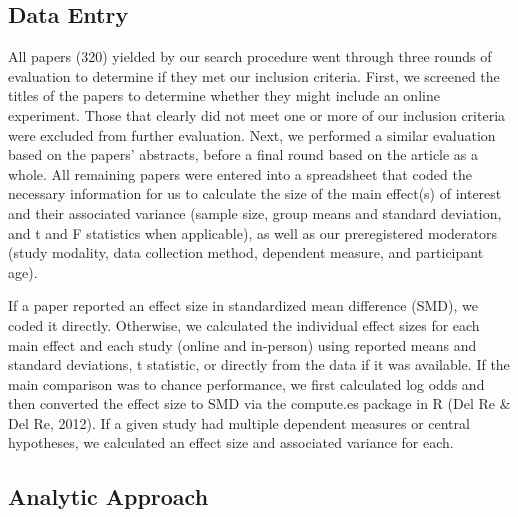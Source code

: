 \documentclass[
  man,floatsintext]{apa6}
\begin{document}
\hypertarget{data-entry}{%
\subsection{Data Entry}\label{data-entry}}

All papers (320) yielded by our search procedure went through three rounds of evaluation to determine if they met our inclusion criteria. First, we screened the titles of the papers to determine whether they might include an online experiment. Those that clearly did not meet one or more of our inclusion criteria were excluded from further evaluation. Next, we performed a similar evaluation based on the papers' abstracts, before a final round based on the article as a whole. All remaining papers were entered into a spreadsheet that coded the necessary information for us to calculate the size of the main effect(s) of interest and their associated variance (sample size, group means and standard deviation, and t and F statistics when applicable), as well as our preregistered moderators (study modality, data collection method, dependent measure, and participant age).

If a paper reported an effect size in standardized mean difference (SMD), we coded it directly. Otherwise, we calculated the individual effect sizes for each main effect and each study (online and in-person) using reported means and standard deviations, t statistic, or directly from the data if it was available. If the main comparison was to chance performance, we first calculated log odds and then converted the effect size to SMD via the compute.es package in R (Del Re \& Del Re, 2012). If a given study had multiple dependent measures or central hypotheses, we calculated an effect size and associated variance for each.

\hypertarget{analytic-approach}{%
\subsection{Analytic Approach}\label{analytic-approach}}
\end{document}
